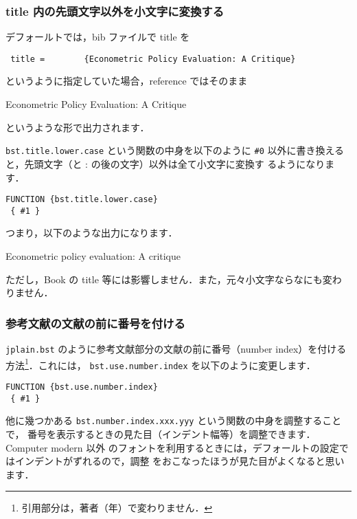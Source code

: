 \documentclass[a4j,10pt]{jarticle}
\begin{document}
\subsubsection{title 内の先頭文字以外を小文字に変換する}

デフォールトでは，bib ファイルで title を
\begin{center}
  \verb| title =        {Econometric Policy Evaluation: A Critique}|
\end{center}
というように指定していた場合，reference ではそのまま
\begin{center}
 Econometric Policy Evaluation: A Critique
\end{center}
というような形で出力されます．

\texttt{bst.title.lower.case} という関数の中身を以下のように \verb|#0| 
以外に書き換えると，先頭文字（と : の後の文字）以外は全て小文字に変換す
るようになります．
\begin{screen}
\begin{verbatim}
FUNCTION {bst.title.lower.case}
 { #1 }
\end{verbatim}
\end{screen}

つまり，以下のような出力になります．
\begin{center}
 Econometric policy evaluation: A critique
\end{center}

ただし，Book の title 等には影響しません．また，元々小文字ならなにも変わ
りません．

\subsubsection{参考文献の文献の前に番号を付ける}

\texttt{jplain.bst} のように参考文献部分の文献の前に番号（number index）を付ける
方法\footnote{引用部分は，著者（年）で変わりません．}．これには，
\texttt{bst.use.number.index} を以下のように変更します．
\begin{screen}
\begin{verbatim}
FUNCTION {bst.use.number.index}
 { #1 }
\end{verbatim}
\end{screen}

他に幾つかある \texttt{bst.number.index.xxx.yyy} という関数の中身を調整することで，
番号を表示するときの見た目（インデント幅等）を調整できます．Computer modern 以外
のフォントを利用するときには，デフォールトの設定ではインデントがずれるので，調整
をおこなったほうが見た目がよくなると思います．
\end{document}
